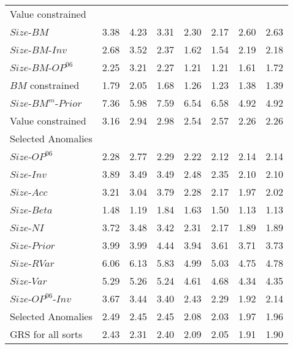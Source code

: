 \begin{table}[!ht]
\begin{tabular}{lrrrrrrr}
  \multicolumn{8}{l}{Value constrained}  \\
    $Size$-$BM$             & 3.38  & 4.23  & 3.31  & 2.30  & 2.17  & 2.60  & 2.63  \\
    $Size$-$BM$-$Inv$       & 2.68  & 3.52  & 2.37  & 1.62  & 1.54  & 2.19  & 2.18  \\
    $Size$-$BM$-$OP^{06}$   & 2.25  & 3.21  & 2.27  & 1.21  & 1.21  & 1.61  & 1.72  \\
      $BM$ constrained      & 1.79  & 2.05  & 1.68  & 1.26  & 1.23  & 1.38  & 1.39  \\
  [1em]
    $Size$-$BM^m$-$Prior$   & 7.36  & 5.98  & 7.59  & 6.54  & 6.58  & 4.92  & 4.92  \\
      Value constrained     & 3.16  & 2.94  & 2.98  & 2.54  & 2.57  & 2.26  & 2.26  \\
  [1em]
  \multicolumn{8}{l}{Selected Anomalies}  \\
    $Size$-$OP^{06}$        & 2.28  & 2.77  & 2.29  & 2.22  & 2.12  & 2.14  & 2.14  \\
    $Size$-$Inv$            & 3.89  & 3.49  & 3.49  & 2.48  & 2.35  & 2.10  & 2.10  \\
    $Size$-$Acc$            & 3.21  & 3.04  & 3.79  & 2.28  & 2.17  & 1.97  & 2.02  \\
    $Size$-$Beta$           & 1.48  & 1.19  & 1.84  & 1.63  & 1.50  & 1.13  & 1.13  \\
    $Size$-$NI$             & 3.72  & 3.48  & 3.42  & 2.31  & 2.17  & 1.89  & 1.89  \\
    $Size$-$Prior$          & 3.99  & 3.99  & 4.44  & 3.94  & 3.61  & 3.71  & 3.73  \\
    $Size$-$RVar$           & 6.06  & 6.13  & 5.83  & 4.99  & 5.03  & 4.75  & 4.78  \\
    $Size$-$Var$            & 5.29  & 5.26  & 5.24  & 4.61  & 4.68  & 4.34  & 4.35  \\
    $Size$-$OP^{06}$-$Inv$  & 3.67  & 3.44  & 3.40  & 2.43  & 2.29  & 1.92  & 2.14  \\
      Selected Anomalies    & 2.49  & 2.45  & 2.45  & 2.08  & 2.03  & 1.97  & 1.96  \\
  [1em]
    GRS for all sorts       & 2.43  & 2.31  & 2.40  & 2.09  & 2.05  & 1.91  & 1.90  \\
  
  \bottomrule
\end{tabular}
\label{tbl:GRS}
\end{table}
